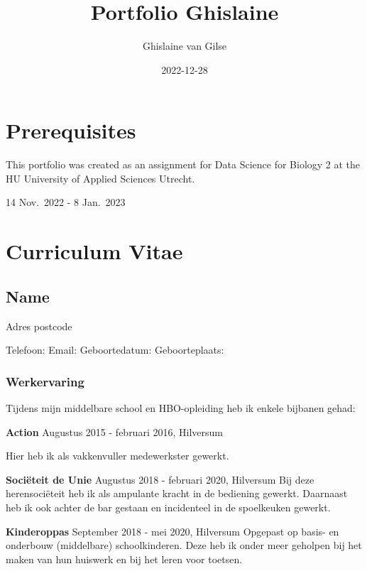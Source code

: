\documentclass[
]{book}
\title{Portfolio Ghislaine}
\author{Ghislaine van Gilse}
\date{2022-12-28}
\begin{document}
\maketitle

{
\setcounter{tocdepth}{1}
\tableofcontents
}
\hypertarget{prerequisites}{%
\chapter*{Prerequisites}\label{prerequisites}}

This portfolio was created as an assignment for Data Science for Biology 2 at the HU University of Applied Sciences Utrecht.

14 Nov.~2022 - 8 Jan.~2023

\hypertarget{curriculum-vitae}{%
\chapter*{Curriculum Vitae}\label{curriculum-vitae}}

\hypertarget{name}{%
\section*{Name}\label{name}}

Adres
postcode

Telefoon:
Email:
Geboortedatum:
Geboorteplaats:

\hypertarget{werkervaring}{%
\subsection*{Werkervaring}\label{werkervaring}}

Tijdens mijn middelbare school en HBO-opleiding heb ik enkele bijbanen gehad:

\textbf{Action}
Augustus 2015 - februari 2016, Hilversum

Hier heb ik als vakkenvuller medewerkster gewerkt.

\textbf{Sociëteit de Unie}
Augustus 2018 - februari 2020, Hilversum
Bij deze herensociëteit heb ik als ampulante kracht in de bediening gewerkt. Daarnaast heb ik ook achter de bar gestaan en incidenteel in de spoelkeuken gewerkt.

\textbf{Kinderoppas}
September 2018 - mei 2020, Hilversum
Opgepast op basis- en onderbouw (middelbare) schoolkinderen. Deze heb ik onder meer geholpen bij het maken van hun huiswerk en bij het leren voor toetsen.
\end{document}
